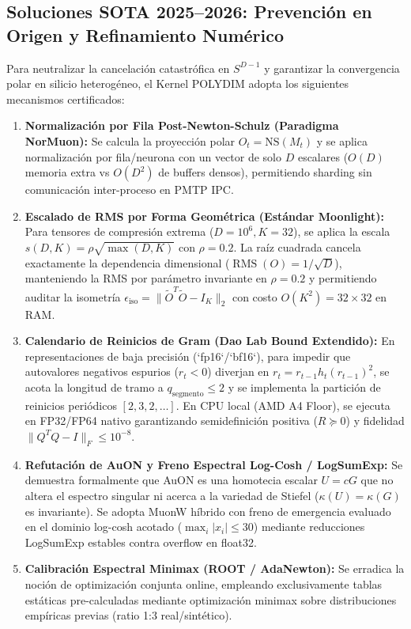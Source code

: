 \subsection{Soluciones SOTA 2025--2026: Prevención en Origen y Refinamiento Numérico}
Para neutralizar la cancelación catastrófica en $S^{D-1}$ y garantizar la convergencia polar en silicio heterogéneo, el Kernel POLYDIM adopta los siguientes mecanismos certificados:
\begin{enumerate}
    \item \textbf{Normalización por Fila Post-Newton-Schulz (Paradigma NorMuon):} Se calcula la proyección polar $O_t = \text{NS}(M_t)$ y se aplica normalización por fila/neurona con un vector de solo $D$ escalares ($O(D)$ memoria extra vs $O(D^2)$ de buffers densos), permitiendo sharding sin comunicación inter-proceso en PMTP IPC.
    \item \textbf{Escalado de RMS por Forma Geométrica (Estándar Moonlight):} Para tensores de compresión extrema ($D = 10^6, K = 32$), se aplica la escala $s(D, K) = \rho \sqrt{\max(D, K)}$ con $\rho = 0.2$. La raíz cuadrada cancela exactamente la dependencia dimensional ($\operatorname{RMS}(O) = 1/\sqrt{D}$), manteniendo la RMS por parámetro invariante en $\rho = 0.2$ y permitiendo auditar la isometría $\epsilon_{\text{iso}} = \|\widetilde{O}^T \widetilde{O} - I_K\|_2$ con costo $O(K^2) = 32 \times 32$ en RAM.
    \item \textbf{Calendario de Reinicios de Gram (Dao Lab Bound Extendido):} En representaciones de baja precisión (`fp16`/`bf16`), para impedir que autovalores negativos espurios ($r_t < 0$) diverjan en $r_{t} = r_{t-1} h_t(r_{t-1})^2$, se acota la longitud de tramo a $q_{\text{segmento}} \le 2$ y se implementa la partición de reinicios periódicos $[2, 3, 2, \dots]$. En CPU local (AMD A4 Floor), se ejecuta en FP32/FP64 nativo garantizando semidefinición positiva ($R \succeq 0$) y fidelidad $\|Q^T Q - I\|_F \le 10^{-8}$.
    \item \textbf{Refutación de AuON y Freno Espectral Log-Cosh / LogSumExp:} Se demuestra formalmente que AuON es una homotecia escalar $U = cG$ que no altera el espectro singular ni acerca a la variedad de Stiefel ($\kappa(U) = \kappa(G)$ es invariante). Se adopta MuonW híbrido con freno de emergencia evaluado en el dominio log-cosh acotado ($\max_i |x_i| \le 30$) mediante reducciones LogSumExp estables contra overflow en float32.
    \item \textbf{Calibración Espectral Minimax (ROOT / AdaNewton):} Se erradica la noción de optimización conjunta online, empleando exclusivamente tablas estáticas pre-calculadas mediante optimización minimax sobre distribuciones empíricas previas (ratio 1:3 real/sintético).
\end{enumerate}


